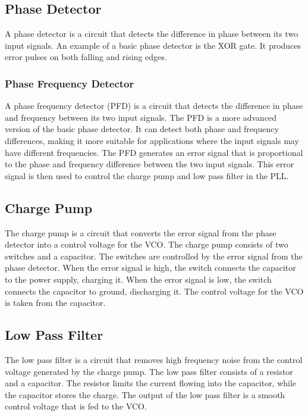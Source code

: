 \subsection{Phase Detector}
A phase detector is a circuit that detects the difference in phase between its two input
signals. An example of a basic phase detector is the XOR gate. It produces error pulses on both
falling and rising edges.

\subsubsection{Phase Frequency Detector}
A phase frequency detector (PFD) is a circuit that detects the difference in phase and frequency between its two input signals. The PFD is a more advanced version of the basic phase detector. It can detect both phase and frequency differences, making it more suitable for applications where the input signals may have different frequencies. The PFD generates an error signal that is proportional to the phase and frequency difference between the two input signals. This error signal is then used to control the charge pump and low pass filter in the PLL.

\subsection{Charge Pump}
The charge pump is a circuit that converts the error signal from the phase detector into a control voltage for the VCO. The charge pump consists of two switches and a capacitor. The switches are controlled by the error signal from the phase detector. When the error signal is high, the switch connects the capacitor to the power supply, charging it. When the error signal is low, the switch connects the capacitor to ground, discharging it. The control voltage for the VCO is taken from the capacitor.

\subsection{Low Pass Filter}
The low pass filter is a circuit that removes high frequency noise from the control voltage generated by the charge pump. The low pass filter consists of a resistor and a capacitor. The resistor limits the current flowing into the capacitor, while the capacitor stores the charge. The output of the low pass filter is a smooth control voltage that is fed to the VCO.
% 
